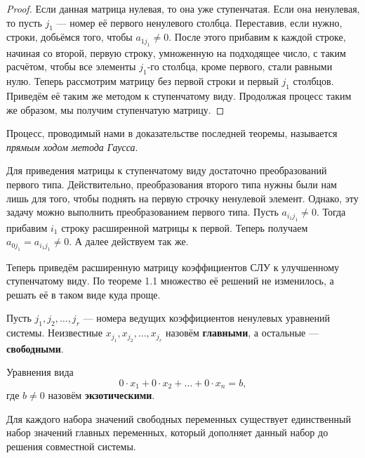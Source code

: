 \begin{proof}
    Если данная матрица нулевая, то она уже ступенчатая. Если она ненулевая, то пусть $j_1$ --- номер её первого ненулевого столбца. Переставив, если нужно, строки, добьёмся того, чтобы $a_{1j_1} \ne 0$. После этого прибавим к каждой строке, начиная со второй, первую строку, умноженную на подходящее число, с таким расчётом, чтобы все элементы $j_1$-го столбца, кроме первого, стали равными нулю. Теперь рассмотрим матрицу без первой строки и первый $j_1$ столбцов. Приведём её таким же методом к ступенчатому виду. Продолжая процесс таким же образом, мы получим ступенчатую матрицу.
\end{proof}

Процесс, проводимый нами в доказательстве последней теоремы, называется \textit{прямым ходом метода Гаусса}.

\begin{orangebox}
    Для приведения матрицы к ступенчатому виду достаточно преобразований первого типа. Действительно, преобразования второго типа нужны были нам лишь для того, чтобы поднять на первую строчку ненулевой элемент. Однако, эту задачу можно выполнить преобразованием первого типа. Пусть $a_{i_1j_1} \ne 0$. Тогда прибавим $i_1$ строку расширенной матрицы к первой. Теперь получаем $a_{0j_1} = a_{i_1j_1} \ne 0$. А далее действуем так же.
\end{orangebox}

Теперь приведём расширенную матрицу коэффициентов СЛУ к улучшенному ступенчатому виду. По теореме 1.1 множество её решений не изменилось, а решать её в таком виде куда проще.

\begin{definition}
    Пусть $j_1, j_2, \ldots, j_r$ --- номера ведущих коэффициентов ненулевых уравнений системы. Неизвестные $x_{j_1}, x_{j_2}, \ldots, x_{j_r}$ назовём \textbf{главными}, а остальные --- \textbf{свободными}.
\end{definition}

\begin{definition}
    Уравнения вида
    $$
    0\cdot x_1 + 0\cdot x_2 + \ldots + 0\cdot x_n = b,
    $$
    где $b \ne 0$ назовём \textbf{экзотическими}.
\end{definition}

\begin{theorem}
    Для каждого набора значений свободных переменных существует единственный набор значений главных переменных, который дополняет данный набор до решения совместной системы.
\end{theorem}

